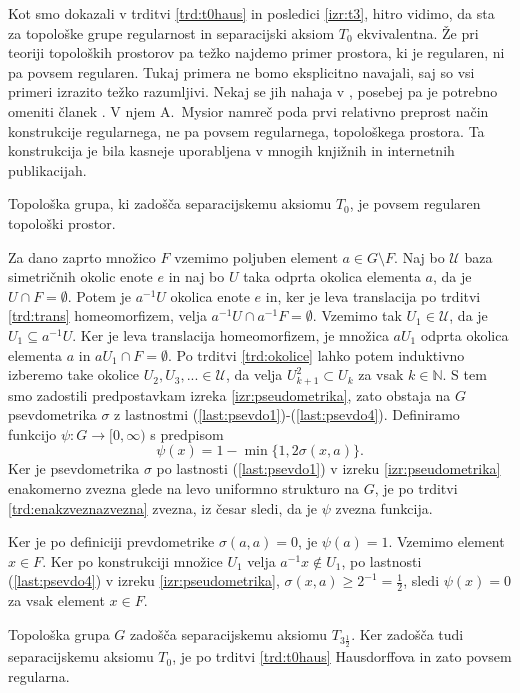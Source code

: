 \documentclass[mat1]{fmfdelo}
\newcommand{\N}{\mathbb N}
\newcommand{\Ucurl}{\mathcal{U}}
\begin{document}
Kot smo dokazali v trditvi \ref{trd:t0haus} in posledici \ref{izr:t3}, hitro vidimo, da sta za topološke grupe regularnost in separacijski aksiom $T_0$ ekvivalentna. Že pri teoriji topoloških prostorov pa težko najdemo primer prostora, ki je regularen, ni pa povsem regularen. Tukaj primera ne bomo eksplicitno navajali, saj so vsi primeri izrazito težko razumljivi. Nekaj se jih nahaja v \cite{bib:counterexamples}, posebej pa je potrebno omeniti članek \cite{bib:clanekt3pol}. V njem A.~Mysior namreč poda prvi relativno preprost način konstrukcije regularnega, ne pa povsem regularnega, topološkega prostora. Ta konstrukcija je bila kasneje uporabljena v mnogih knjižnih in internetnih publikacijah.
\begin{izrek}\label{izr:t3pol}
	Topološka grupa, ki zadošča separacijskemu aksiomu $T_0$, je povsem regularen topološki prostor.
\end{izrek}

\begin{dokaz}
Za dano zaprto množico $F$ vzemimo poljuben element $a \in G\setminus F$.
Naj bo $\Ucurl$ baza simetričnih okolic enote $e$ in naj bo $U$ taka odprta okolica elementa $a$, da je $U \cap F = \emptyset$. Potem je $a^{-1}U$ okolica enote $e$ in, ker je leva translacija po trditvi \ref{trd:trans} homeomorfizem, velja $a^{-1}U \cap a^{-1}F = \emptyset$. Vzemimo tak $U_1 \in \Ucurl$, da je $U_1 \subseteq a^{-1}U$. Ker je leva translacija homeomorfizem, je množica $aU_1$ odprta okolica elementa $a$ in $aU_1 \cap F = \emptyset$. Po trditvi \ref{trd:okolice} lahko potem induktivno izberemo take okolice $U_2, U_3,... \in \Ucurl$, da velja $U_{k+1}^2 \subset U_k$ za vsak $k \in \N$. S tem smo zadostili predpostavkam izreka \ref{izr:pseudometrika}, zato obstaja na $G$ psevdometrika $\sigma$ z lastnostmi (\ref{last:psevdo1})-(\ref{last:psevdo4}). Definiramo funkcijo $\psi\colon G \to [0, \infty)$ s predpisom
\[ \psi(x) = 1 - \min\lbrace 1, 2\sigma(x, a)\rbrace. \]
Ker je psevdometrika $\sigma$ po lastnosti (\ref{last:psevdo1}) v izreku \ref{izr:pseudometrika} enakomerno zvezna glede na levo uniformno strukturo na $G$, je po trditvi \ref{trd:enakzveznazvezna} zvezna, iz česar sledi, da je $\psi$ zvezna funkcija.

Ker je po definiciji prevdometrike $\sigma(a, a) = 0$, je $\psi(a) = 1$.
Vzemimo element $x \in F$. Ker po konstrukciji množice $U_1$ velja $a^{-1}x \notin U_1$, po lastnosti (\ref{last:psevdo4}) v izreku \ref{izr:pseudometrika}, $\sigma(x, a) \geq 2^{-1} = \frac{1}{2}$, sledi $\psi(x) = 0$ za vsak element $x \in F$.

Topološka grupa $G$ zadošča separacijskemu aksiomu $T_{3\frac{1}{2}}$. Ker zadošča tudi separacijskemu aksiomu $T_0$, je po trditvi \ref{trd:t0haus} Hausdorffova in zato povsem regularna.
\end{dokaz}
\end{document}
